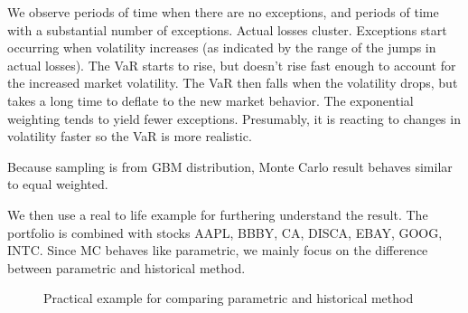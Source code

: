 \documentclass[letterpaper,11pt, oneside]{layout}
\begin{document}
We observe periods of time when there are no exceptions, and periods of time with a substantial number of exceptions.
Actual losses cluster.
Exceptions start occurring when volatility increases (as indicated by the range of the jumps in actual losses). The VaR starts to rise, but doesn’t rise fast enough to account for the increased market volatility. The VaR then falls when the volatility drops, but takes a long time to deflate to the new market behavior. 
The exponential weighting tends to yield fewer exceptions. Presumably, it is reacting to changes in volatility faster so the VaR is more realistic. 

Because sampling is from GBM distribution, Monte Carlo result behaves similar to equal weighted.

We then use a real to life example for furthering understand the result. The portfolio is combined with stocks AAPL, BBBY, CA, DISCA, EBAY, GOOG, INTC. Since MC behaves like parametric, we mainly focus on the difference between parametric and historical method.

    \begin{figure}[!hbt]
    \center
    \caption{Practical example for comparing parametric and historical method}
    \label{fig:results:vg:loss2}
    \end{figure}
    
\end{document}
